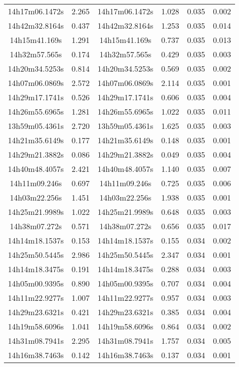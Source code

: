 \begin{table}
\begin{tabular}{cccccc}
14h17m06.1472s & 2.265 & 14h17m06.1472s & 1.028 & 0.035 & 0.002 \\
14h42m32.8164s & 0.437 & 14h42m32.8164s & 1.253 & 0.035 & 0.014 \\
14h15m41.169s & 1.291 & 14h15m41.169s & 0.737 & 0.035 & 0.013 \\
14h32m57.565s & 0.174 & 14h32m57.565s & 0.429 & 0.035 & 0.003 \\
14h20m34.5253s & 0.814 & 14h20m34.5253s & 0.569 & 0.035 & 0.002 \\
14h07m06.0869s & 2.572 & 14h07m06.0869s & 2.114 & 0.035 & 0.001 \\
14h29m17.1741s & 0.526 & 14h29m17.1741s & 0.606 & 0.035 & 0.004 \\
14h26m55.6965s & 1.281 & 14h26m55.6965s & 1.022 & 0.035 & 0.011 \\
13h59m05.4361s & 2.720 & 13h59m05.4361s & 1.625 & 0.035 & 0.003 \\
14h21m35.6149s & 0.177 & 14h21m35.6149s & 0.148 & 0.035 & 0.001 \\
14h29m21.3882s & 0.086 & 14h29m21.3882s & 0.049 & 0.035 & 0.004 \\
14h40m48.4057s & 2.421 & 14h40m48.4057s & 1.140 & 0.035 & 0.007 \\
14h11m09.246s & 0.697 & 14h11m09.246s & 0.725 & 0.035 & 0.006 \\
14h03m22.256s & 1.451 & 14h03m22.256s & 1.938 & 0.035 & 0.001 \\
14h25m21.9989s & 1.022 & 14h25m21.9989s & 0.648 & 0.035 & 0.003 \\
14h38m07.272s & 0.571 & 14h38m07.272s & 0.656 & 0.035 & 0.017 \\
14h14m18.1537s & 0.153 & 14h14m18.1537s & 0.155 & 0.034 & 0.002 \\
14h25m50.5445s & 2.986 & 14h25m50.5445s & 2.347 & 0.034 & 0.001 \\
14h14m18.3475s & 0.191 & 14h14m18.3475s & 0.288 & 0.034 & 0.003 \\
14h05m00.9395s & 0.890 & 14h05m00.9395s & 0.707 & 0.034 & 0.004 \\
14h11m22.9277s & 1.007 & 14h11m22.9277s & 0.957 & 0.034 & 0.003 \\
14h29m23.6321s & 0.421 & 14h29m23.6321s & 0.385 & 0.034 & 0.004 \\
14h19m58.6096s & 1.041 & 14h19m58.6096s & 0.864 & 0.034 & 0.002 \\
14h31m08.7941s & 2.295 & 14h31m08.7941s & 1.757 & 0.034 & 0.005 \\
14h16m38.7463s & 0.142 & 14h16m38.7463s & 0.137 & 0.034 & 0.001 \\

\end{tabular}
\end{table}
